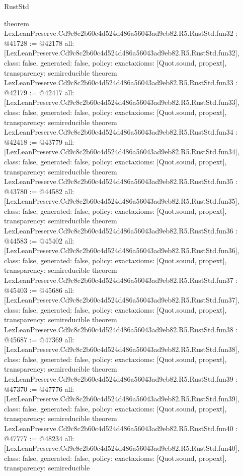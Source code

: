 \begin{lexlean}{RustStd}
\begin{coremodule}
{}
theorem LexLeanPreserve.Cd9c8c2b60c4d524d486a56043ad9eb82.R5.RustStd.fun32 : @41728 := @42178 {
  all: [LexLeanPreserve.Cd9c8c2b60c4d524d486a56043ad9eb82.R5.RustStd.fun32],
  class: false,
  generated: false,
  policy: exact{axioms: [Quot.sound, propext]},
  transparency: semireducible
}
theorem LexLeanPreserve.Cd9c8c2b60c4d524d486a56043ad9eb82.R5.RustStd.fun33 : @42179 := @42417 {
  all: [LexLeanPreserve.Cd9c8c2b60c4d524d486a56043ad9eb82.R5.RustStd.fun33],
  class: false,
  generated: false,
  policy: exact{axioms: [Quot.sound, propext]},
  transparency: semireducible
}
theorem LexLeanPreserve.Cd9c8c2b60c4d524d486a56043ad9eb82.R5.RustStd.fun34 : @42418 := @43779 {
  all: [LexLeanPreserve.Cd9c8c2b60c4d524d486a56043ad9eb82.R5.RustStd.fun34],
  class: false,
  generated: false,
  policy: exact{axioms: [Quot.sound, propext]},
  transparency: semireducible
}
theorem LexLeanPreserve.Cd9c8c2b60c4d524d486a56043ad9eb82.R5.RustStd.fun35 : @43780 := @44582 {
  all: [LexLeanPreserve.Cd9c8c2b60c4d524d486a56043ad9eb82.R5.RustStd.fun35],
  class: false,
  generated: false,
  policy: exact{axioms: [Quot.sound, propext]},
  transparency: semireducible
}
theorem LexLeanPreserve.Cd9c8c2b60c4d524d486a56043ad9eb82.R5.RustStd.fun36 : @44583 := @45402 {
  all: [LexLeanPreserve.Cd9c8c2b60c4d524d486a56043ad9eb82.R5.RustStd.fun36],
  class: false,
  generated: false,
  policy: exact{axioms: [Quot.sound, propext]},
  transparency: semireducible
}
theorem LexLeanPreserve.Cd9c8c2b60c4d524d486a56043ad9eb82.R5.RustStd.fun37 : @45403 := @45686 {
  all: [LexLeanPreserve.Cd9c8c2b60c4d524d486a56043ad9eb82.R5.RustStd.fun37],
  class: false,
  generated: false,
  policy: exact{axioms: [Quot.sound, propext]},
  transparency: semireducible
}
theorem LexLeanPreserve.Cd9c8c2b60c4d524d486a56043ad9eb82.R5.RustStd.fun38 : @45687 := @47369 {
  all: [LexLeanPreserve.Cd9c8c2b60c4d524d486a56043ad9eb82.R5.RustStd.fun38],
  class: false,
  generated: false,
  policy: exact{axioms: [Quot.sound, propext]},
  transparency: semireducible
}
theorem LexLeanPreserve.Cd9c8c2b60c4d524d486a56043ad9eb82.R5.RustStd.fun39 : @47370 := @47776 {
  all: [LexLeanPreserve.Cd9c8c2b60c4d524d486a56043ad9eb82.R5.RustStd.fun39],
  class: false,
  generated: false,
  policy: exact{axioms: [Quot.sound, propext]},
  transparency: semireducible
}
theorem LexLeanPreserve.Cd9c8c2b60c4d524d486a56043ad9eb82.R5.RustStd.fun40 : @47777 := @48234 {
  all: [LexLeanPreserve.Cd9c8c2b60c4d524d486a56043ad9eb82.R5.RustStd.fun40],
  class: false,
  generated: false,
  policy: exact{axioms: [Quot.sound, propext]},
  transparency: semireducible
}
\end{coremodule}
\end{lexlean}
